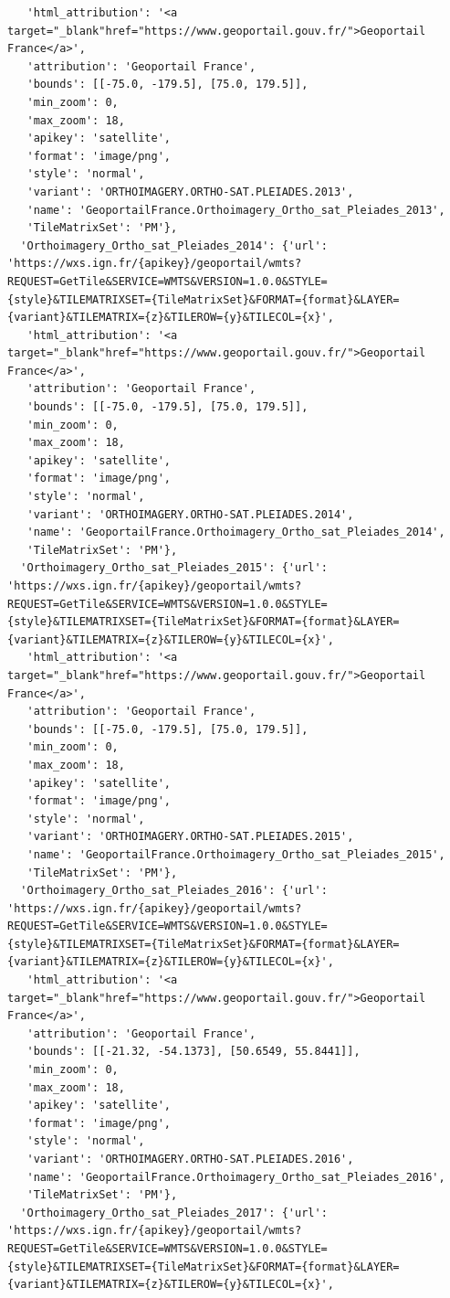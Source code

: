 \documentclass[
  letterpaper,
  DIV=11,
  numbers=noendperiod]{scrreprt}
\begin{document}
\begin{verbatim}
   'html_attribution': '<a target="_blank"href="https://www.geoportail.gouv.fr/">Geoportail France</a>',
   'attribution': 'Geoportail France',
   'bounds': [[-75.0, -179.5], [75.0, 179.5]],
   'min_zoom': 0,
   'max_zoom': 18,
   'apikey': 'satellite',
   'format': 'image/png',
   'style': 'normal',
   'variant': 'ORTHOIMAGERY.ORTHO-SAT.PLEIADES.2013',
   'name': 'GeoportailFrance.Orthoimagery_Ortho_sat_Pleiades_2013',
   'TileMatrixSet': 'PM'},
  'Orthoimagery_Ortho_sat_Pleiades_2014': {'url': 'https://wxs.ign.fr/{apikey}/geoportail/wmts?REQUEST=GetTile&SERVICE=WMTS&VERSION=1.0.0&STYLE={style}&TILEMATRIXSET={TileMatrixSet}&FORMAT={format}&LAYER={variant}&TILEMATRIX={z}&TILEROW={y}&TILECOL={x}',
   'html_attribution': '<a target="_blank"href="https://www.geoportail.gouv.fr/">Geoportail France</a>',
   'attribution': 'Geoportail France',
   'bounds': [[-75.0, -179.5], [75.0, 179.5]],
   'min_zoom': 0,
   'max_zoom': 18,
   'apikey': 'satellite',
   'format': 'image/png',
   'style': 'normal',
   'variant': 'ORTHOIMAGERY.ORTHO-SAT.PLEIADES.2014',
   'name': 'GeoportailFrance.Orthoimagery_Ortho_sat_Pleiades_2014',
   'TileMatrixSet': 'PM'},
  'Orthoimagery_Ortho_sat_Pleiades_2015': {'url': 'https://wxs.ign.fr/{apikey}/geoportail/wmts?REQUEST=GetTile&SERVICE=WMTS&VERSION=1.0.0&STYLE={style}&TILEMATRIXSET={TileMatrixSet}&FORMAT={format}&LAYER={variant}&TILEMATRIX={z}&TILEROW={y}&TILECOL={x}',
   'html_attribution': '<a target="_blank"href="https://www.geoportail.gouv.fr/">Geoportail France</a>',
   'attribution': 'Geoportail France',
   'bounds': [[-75.0, -179.5], [75.0, 179.5]],
   'min_zoom': 0,
   'max_zoom': 18,
   'apikey': 'satellite',
   'format': 'image/png',
   'style': 'normal',
   'variant': 'ORTHOIMAGERY.ORTHO-SAT.PLEIADES.2015',
   'name': 'GeoportailFrance.Orthoimagery_Ortho_sat_Pleiades_2015',
   'TileMatrixSet': 'PM'},
  'Orthoimagery_Ortho_sat_Pleiades_2016': {'url': 'https://wxs.ign.fr/{apikey}/geoportail/wmts?REQUEST=GetTile&SERVICE=WMTS&VERSION=1.0.0&STYLE={style}&TILEMATRIXSET={TileMatrixSet}&FORMAT={format}&LAYER={variant}&TILEMATRIX={z}&TILEROW={y}&TILECOL={x}',
   'html_attribution': '<a target="_blank"href="https://www.geoportail.gouv.fr/">Geoportail France</a>',
   'attribution': 'Geoportail France',
   'bounds': [[-21.32, -54.1373], [50.6549, 55.8441]],
   'min_zoom': 0,
   'max_zoom': 18,
   'apikey': 'satellite',
   'format': 'image/png',
   'style': 'normal',
   'variant': 'ORTHOIMAGERY.ORTHO-SAT.PLEIADES.2016',
   'name': 'GeoportailFrance.Orthoimagery_Ortho_sat_Pleiades_2016',
   'TileMatrixSet': 'PM'},
  'Orthoimagery_Ortho_sat_Pleiades_2017': {'url': 'https://wxs.ign.fr/{apikey}/geoportail/wmts?REQUEST=GetTile&SERVICE=WMTS&VERSION=1.0.0&STYLE={style}&TILEMATRIXSET={TileMatrixSet}&FORMAT={format}&LAYER={variant}&TILEMATRIX={z}&TILEROW={y}&TILECOL={x}',

\end{verbatim}
\end{document}
